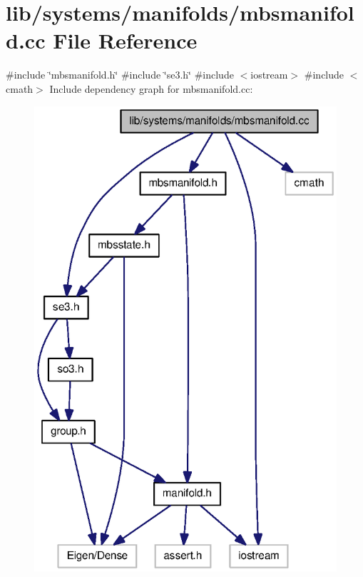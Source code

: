 \section{lib/systems/manifolds/mbsmanifold.cc \-File \-Reference}
\label{mbsmanifold_8cc}
{\ttfamily \#include \char`\"{}mbsmanifold.\-h\char`\"{}}\*
{\ttfamily \#include \char`\"{}se3.\-h\char`\"{}}\*
{\ttfamily \#include $<$iostream$>$}\*
{\ttfamily \#include $<$cmath$>$}\*
\-Include dependency graph for mbsmanifold.\-cc\-:\nopagebreak
\begin{figure}[H]
\begin{center}
\leavevmode
\includegraphics[width=320pt]{mbsmanifold_8cc__incl}
\end{center}
\end{figure}
